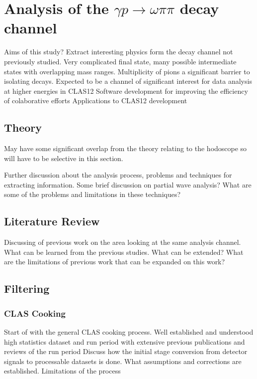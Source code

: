 \chapter{Analysis of the $\gamma p \rightarrow \omega\pi\pi$ decay channel}

Aims of this study?
Extract interesting physics form the decay channel not previously studied.
Very complicated final state, many possible intermediate states with overlapping mass ranges.
Multiplicity of pions a significant barrier to isolating decays.
Expected to be a channel of significant interest for data analysis at higher energies in CLAS12
Software development for improving the efficiency of colaborative efforts
Applications to CLAS12 development

\section{Theory}
May have some significant overlap from the theory relating to the hodoscope so will have to be selective in this section.

Further discussion about the analysis process, problems and techniques for extracting information. 
Some brief discussion on partial wave analysis? 
What are some of the problems and limitations in these techniques?

\section{Literature Review} 
 Discussing of previous work on the area looking at the same analysis channel.
 What can be learned from the previous studies.
 What can be extended?
 What are the limitations of previous work that can be expanded on this work?
 
\section{Filtering}

\subsection{CLAS Cooking}
Start of with the general CLAS cooking process.
Well established and understood high statistics dataset and run period with extensive previous publications and reviews of the run period
Discuss how the initial stage conversion from detector signals to processable datasets is done. 
What assumptions and corrections are established.
Limitations of the process
